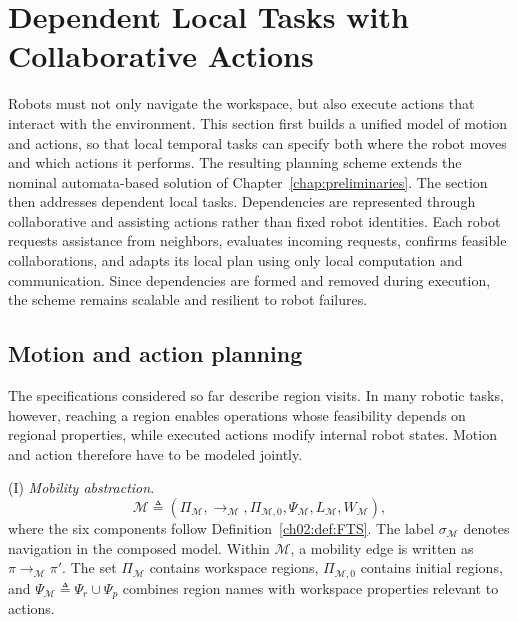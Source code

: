 \section{Dependent Local Tasks with Collaborative Actions}
\label{ch03:sec:dep-local-collab}

Robots must not only navigate the workspace, but also execute actions that
interact with the environment. This section first builds a unified model of
motion and actions, so that local temporal tasks can specify both where the
robot moves and which actions it performs. The resulting planning scheme extends
the nominal automata-based solution of Chapter~\ref{chap:preliminaries}.
The section then addresses dependent local tasks. Dependencies are represented
through collaborative and assisting actions rather than fixed robot identities.
Each robot requests assistance from neighbors, evaluates incoming requests,
confirms feasible collaborations, and adapts its local plan using only local
computation and communication. Since dependencies are formed and removed during
execution, the scheme remains scalable and resilient to robot failures.






\subsection{Motion and action planning}
\label{ch03:sec:action-plan}

The specifications considered so far describe region visits. In many robotic
tasks, however, reaching a region enables operations whose feasibility depends
on regional properties, while executed actions modify internal robot states.
Motion and action therefore have to be modeled jointly. 

(I) \emph{Mobility abstraction}.
{\color{blue}
\begin{equation}
\label{ch03:eq:M}
\mathcal{M} \triangleq
(\Pi_{\mathcal{M}}, \longrightarrow_{\mathcal{M}},
 \Pi_{\mathcal{M},0}, \Psi_{\mathcal{M}}, L_{\mathcal{M}}, W_{\mathcal{M}}),
\end{equation}
where the six components follow Definition~\ref{ch02:def:FTS}.
The label $\sigma_{\mathcal{M}}$ denotes navigation in the composed model.
Within $\mathcal{M}$, a mobility edge is written as
$\pi\longrightarrow_{\mathcal{M}}\pi'$.}
The set
$\Pi_{\mathcal{M}}$ contains workspace regions, $\Pi_{\mathcal{M},0}$ contains
initial regions, and
$\Psi_{\mathcal{M}} \triangleq \Psi_r \cup \Psi_p$ combines region names with
workspace properties relevant to actions.


